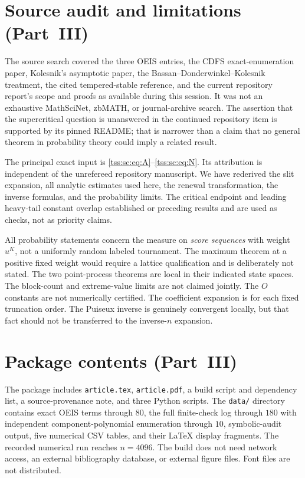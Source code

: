 \documentclass[11pt]{article}
\theoremstyle{remark}\newtheorem{remark}[theorem]{Remark}
\theoremstyle{definition}\newtheorem{definition}[theorem]{Definition}
\begin{document}
\section{Source audit and limitations (Part~III)}
\label{tss:sc:app:audit}
The source search covered the three OEIS entries, the CDFS exact-enumeration paper, Kolesnik's asymptotic paper, the Bassan--Donderwinkel--Kolesnik treatment, the cited tempered-stable reference, and the current repository report's scope and proofs as available during this session. It was not an exhaustive MathSciNet, zbMATH, or journal-archive search. The assertion that the supercritical question is unanswered in the continued repository item is supported by its pinned README; that is narrower than a claim that no general theorem in probability theory could imply a related result.

The principal exact input is \eqref{tss:sc:eq:A}--\eqref{tss:sc:eq:N}. Its attribution is independent of the unrefereed repository manuscript. We have rederived the slit expansion, all analytic estimates used here, the renewal transformation, the inverse formulas, and the probability limits. The critical endpoint and leading heavy-tail constant overlap established or preceding results and are used as checks, not as priority claims.

All probability statements concern the measure on \emph{score sequences} with weight $u^K$, not a uniformly random labeled tournament. The maximum theorem at a positive fixed weight would require a lattice qualification and is deliberately not stated. The two point-process theorems are local in their indicated state spaces. The block-count and extreme-value limits are not claimed jointly. The $O$ constants are not numerically certified. The coefficient expansion is for each fixed truncation order. The Puiseux inverse is genuinely convergent locally, but that fact should not be transferred to the inverse-$n$ expansion.

\section{Package contents (Part~III)}
\label{tss:sc:app:package}
The package includes \texttt{article.tex}, \texttt{article.pdf}, a build script and dependency list, a source-provenance note, and three Python scripts. The \texttt{data/} directory contains exact OEIS terms through $80$, the full finite-check log through $180$ with independent component-polynomial enumeration through $10$, symbolic-audit output, five numerical CSV tables, and their LaTeX display fragments. The recorded numerical run reaches $n=4096$. The build does not need network access, an external bibliography database, or external figure files. Font files are not distributed.
\end{document}
